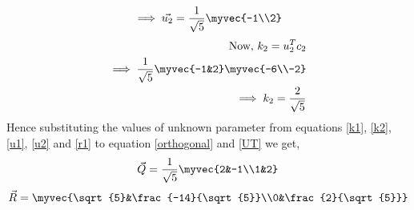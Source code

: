 \documentclass[journal,12pt,twocolumn]{IEEEtran}
\begin{document}
\begin{align}
\implies\vec{u_2} = \frac{1}{\sqrt{5}}\myvec{-1\\2}\label{u2}
\end{align}
\begin{align}
\mbox{Now, } k_2 = u_2^Tc_2\\
\implies \frac{1}{\sqrt{5}}\myvec{-1&2}\myvec{-6\\-2}\\\implies k_2 = \frac{2}{\sqrt{5}} \label{k2}
\end{align}
Hence substituting the values of unknown parameter from equations \eqref{k1}, \eqref{k2}, \eqref{u1}, \eqref{u2} and \eqref{r1} to equation \eqref{orthogonal} and \eqref{UT} we get,
\begin{align}
\vec{Q} = \frac{1}{\sqrt{5}}\myvec{2&-1\\1&2}
\end{align} 
\begin{align}
\vec{R} = \myvec{\sqrt{5}&\frac{-14}{\sqrt{5}}\\0&\frac{2}{\sqrt{5}}}
\end{align}
\end{document}
